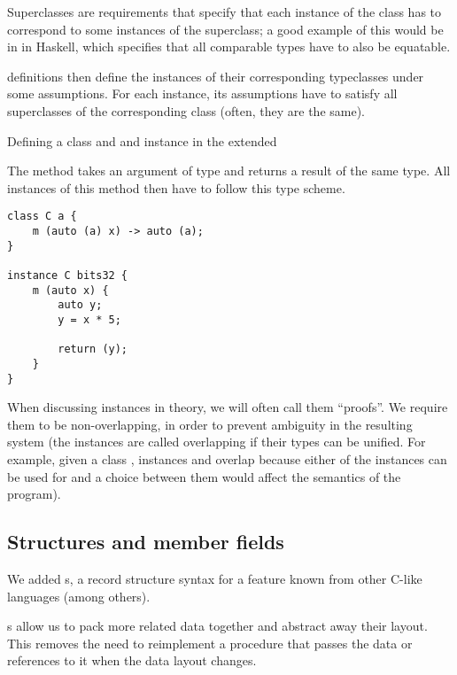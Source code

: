 Superclasses are requirements that specify that each instance of the class has to correspond to some instances of the superclass; a good example of this would be  in  in Haskell, which specifies that all comparable types have to also be equatable.

 definitions then define the instances of their corresponding typeclasses under some assumptions. For each instance, its assumptions have to satisfy all superclasses of the corresponding class (often, they are the same).

\begin{codex}
    \caption{Defining a class and and instance in the extended \cmm}
    \label{cex:classInstance}

    \begin{flushleft}
        \noindent The method  takes an argument of type  and returns a result of the same type. All instances of this method then have to follow this type scheme.
    \end{flushleft}

    \begin{lstlisting}
class C a {
    m (auto (a) x) -> auto (a);
}

instance C bits32 {
    m (auto x) {
        auto y;
        y = x * 5;

        return (y);
    }
}
    \end{lstlisting}
\end{codex}

When discussing instances in theory, we will often call them ``proofs''. We require them to be non-overlapping, in order to prevent ambiguity in the resulting system (the instances are called overlapping if their types can be unified. For example, given a class , instances  and  overlap because either of the instances can be used for  and a choice between them would affect the semantics of the program).

\subsection{Structures and member fields}
\label{sec:structExt}

We added s, a record structure syntax for a feature known from other C-like languages (among others).

s allow us to pack more related data together and abstract away their layout. This removes the need to reimplement a procedure that passes the data or references to it when the data layout changes.


